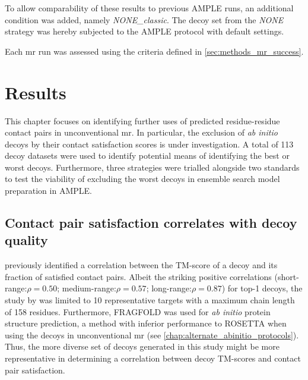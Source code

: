 To allow comparability of these results to previous AMPLE runs, an additional condition was added, namely \textit{NONE\_classic}. The decoy set from the \textit{NONE} strategy was hereby subjected to the AMPLE protocol with default settings.

Each \gls{mr} run was assessed using the criteria defined in \cref{sec:methods_mr_success}.

\section{Results}
This chapter focuses on identifying further uses of predicted residue-residue contact pairs in unconventional \gls{mr}. In particular, the exclusion of \textit{ab initio} decoys by their contact satisfaction scores is under investigation. A total of 113 decoy datasets were used to identify potential means of identifying the best or worst decoys. Furthermore, three strategies were trialled alongside two standards to test the viability of excluding the worst decoys in ensemble search model preparation in AMPLE.

\subsection{Contact pair satisfaction correlates with decoy quality}
\textcite{Kosciolek2014-bt} previously identified a correlation between the TM-score of a decoy and its fraction of satisfied contact pairs. Albeit the striking positive correlations (short-range:$\rho=0.50$; medium-range:$\rho=0.57$; long-range:$\rho=0.87$) for top-1 decoys, the study by \textcite{Kosciolek2014-bt} was limited to 10 representative targets with a maximum chain length of 158 residues. Furthermore, FRAGFOLD \cite{Jones2001-mc} was used for \textit{ab initio} protein structure prediction, a method with inferior performance to ROSETTA \cite{Rohl2004-dj} when using the decoys in unconventional \gls{mr} (see \cref{chap:alternate_abinitio_protocols}). Thus, the more diverse set of decoys generated in this study might be more representative in determining a correlation between decoy TM-scores and contact pair satisfaction.

